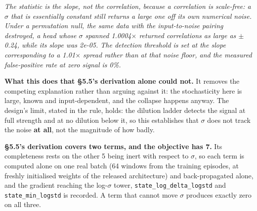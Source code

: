 \documentclass[10pt]{article}
\begin{document}
\emph{The statistic is the slope, not the correlation, because a correlation is scale-free: a $\hat{\sigma}$ that is essentially constant still returns a large one off its own numerical noise. Under a permutation null, the same data with the input-to-noise pairing destroyed, a head whose $\sigma$ spanned 1.0004$\times$ returned correlations as large as $\pm$0.24, while its slope was 2e-05. The detection threshold is set at the slope corresponding to a 1.01$\times$ spread rather than at that noise floor, and the measured false-positive rate at zero signal is 0\%.}

\textbf{What this does that \S{}5.5's derivation alone could not.} It removes the competing explanation rather than arguing against it: the stochasticity here is large, known and input-dependent, and the collapse happens anyway. The design's limit, stated in the rule, holds: the dilution ladder detects the signal at full strength and at no dilution below it, so this establishes that $\sigma$ does not track the noise \textbf{at all}, not the magnitude of how badly.

\textbf{\S{}5.5's derivation covers two terms, and the objective has 7.} Its completeness rests on the other 5 being inert with respect to $\sigma$, so each term is computed alone on one real batch (64 windows from the training episodes, at freshly initialised weights of the released architecture) and back-propagated alone, and the gradient reaching the log-$\sigma$ tower, \texttt{state\_log\_delta\_logstd} and \texttt{state\_min\_logstd} is recorded. A term that cannot move $\sigma$ produces exactly zero on all three.

\begin{center}\small{}\end{center}
\end{document}
